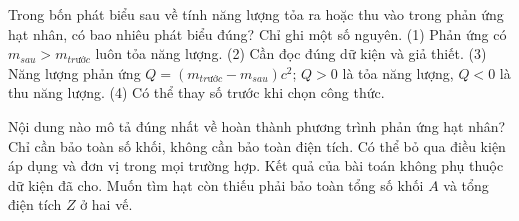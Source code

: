 \begin{ex}
Trong bốn phát biểu sau về tính năng lượng tỏa ra hoặc thu vào trong phản ứng hạt nhân, có bao nhiêu phát biểu đúng? Chỉ ghi một số nguyên. (1) Phản ứng có $m_{sau}\gt m_{trước}$ luôn tỏa năng lượng. (2) Cần đọc đúng dữ kiện và giả thiết. (3) Năng lượng phản ứng $Q=(m_{trước}-m_{sau})c^2$; $Q>0$ là tỏa năng lượng, $Q<0$ là thu năng lượng. (4) Có thể thay số trước khi chọn công thức.
\end{ex}

\begin{ex}
Nội dung nào mô tả đúng nhất về hoàn thành phương trình phản ứng hạt nhân?
\choice
{Chỉ cần bảo toàn số khối, không cần bảo toàn điện tích.}
{Có thể bỏ qua điều kiện áp dụng và đơn vị trong mọi trường hợp.}
{Kết quả của bài toán không phụ thuộc dữ kiện đã cho.}
{\True Muốn tìm hạt còn thiếu phải bảo toàn tổng số khối $A$ và tổng điện tích $Z$ ở hai vế.}
\end{ex}

